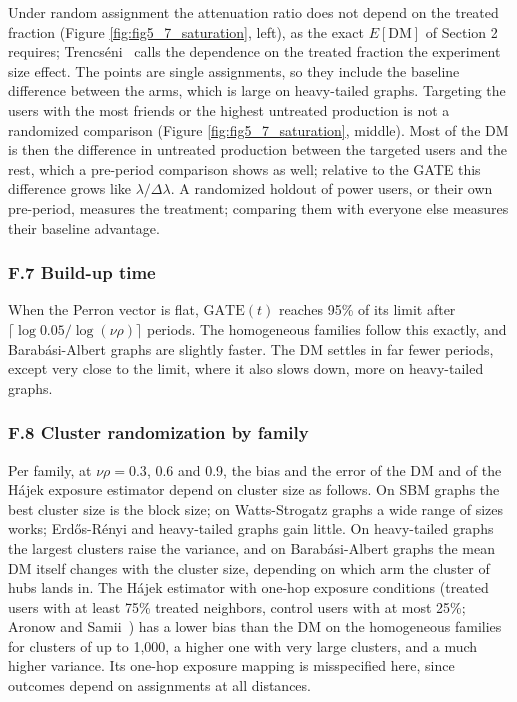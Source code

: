 \documentclass[final,5p,times,twocolumn,number]{elsarticle}
\begin{document}
Under random assignment the attenuation ratio does not depend on the treated fraction (Figure \ref{fig:fig5_7_saturation}, left), as the exact $E[\mathrm{DM}]$  of Section 2 requires; Trencséni~\cite{r20} calls the dependence on the treated fraction the experiment size effect. The points are single assignments, so they include the baseline difference between the arms, which is large on heavy-tailed graphs. Targeting the users with the most friends or the highest untreated production is not a randomized comparison (Figure \ref{fig:fig5_7_saturation}, middle). Most of the DM is then the difference in untreated production between the targeted users and the rest, which a pre-period comparison shows as well; relative to the GATE this difference grows like $\lambda/\Delta\lambda$. A randomized holdout of power users, or their own pre-period, measures the treatment; comparing them with everyone else measures their baseline advantage.


\subsubsection*{F.7 Build-up time}

When the Perron vector is flat, $\mathrm{GATE}(t)$  reaches 95\% of its limit after $\lceil\log 0.05/\log(\nu\rho)\rceil$  periods. The homogeneous families follow this exactly, and Barabási-Albert graphs are slightly faster. The DM settles in far fewer periods, except very close to the limit, where it also slows down, more on heavy-tailed graphs.



\subsubsection*{F.8 Cluster randomization by family}

Per family, at $\nu\rho = 0.3$, 0.6 and 0.9, the bias and the error of the DM and of the Hájek exposure estimator depend on cluster size as follows. On SBM graphs the best cluster size is the block size; on Watts-Strogatz graphs a wide range of sizes works; Erdős-Rényi and heavy-tailed graphs gain little. On heavy-tailed graphs the largest clusters raise the variance, and on Barabási-Albert graphs the mean DM itself changes with the cluster size, depending on which arm the cluster of hubs lands in. The Hájek estimator with one-hop exposure conditions (treated users with at least 75\% treated neighbors, control users with at most 25\%; Aronow and Samii~\cite{r1}) has a lower bias than the DM on the homogeneous families for clusters of up to 1,000, a higher one with very large clusters, and a much higher variance. Its one-hop exposure mapping is misspecified here, since outcomes depend on assignments at all distances.
\end{document}
